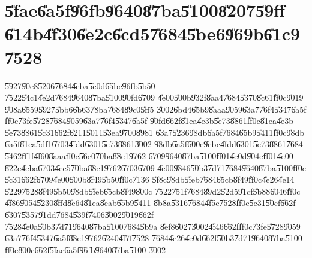                       

\part{\U{5fae}\U{6a5f}\U{96fb}\U{9640}\U{87ba}\U{5100}\U{8207}\U{59ff}%
\U{614b}\U{4f30}\U{6e2c}\U{6cd5}\U{7684}\U{5be6}\U{969b}\U{61c9}\U{7528}}

\setcounter{page}{1}

\U{5927}\U{90e8}\U{5206}\U{7684}\U{4eba}\U{5c0d}\U{65bc}\U{96fb}\U{5b50}%
\U{7522}\U{54c1}\U{4e2d}\U{7684}\U{9640}\U{87ba}\U{5100}\U{90fd}\U{6709}%
\U{4e00}\U{500b}\U{932f}\U{8aa4}\U{7684}\U{5370}\U{8c61}\U{ff0c}\U{9019}%
\U{908a}\U{6559}\U{5927}\U{5bb6}\U{6b63}\U{78ba}\U{7684}\U{89c0}\U{5ff5}%
\U{3002}\U{6bd4}\U{65b9}\U{8aaa}\U{9059}\U{63a7}\U{76f4}\U{5347}\U{6a5f}%
\U{ff0c}\U{73fe}\U{5728}\U{7684}\U{9059}\U{63a7}\U{76f4}\U{5347}\U{6a5f}%
\U{90fd}\U{662f}\U{81ea}\U{4e3b}\U{5e73}\U{8861}\U{ff0c}\U{81ea}\U{4e3b}%
\U{5e73}\U{8861}\U{5c31}\U{662f}\U{6211}\U{5011}\U{53ea}\U{9700}\U{8981}%
\U{63a7}\U{5236}\U{98db}\U{6a5f}\U{7684}\U{65b9}\U{5411}\U{ff0c}\U{98db}%
\U{6a5f}\U{81ea}\U{5df1}\U{6703}\U{4fdd}\U{6301}\U{5e73}\U{8861}\U{3002}%
\U{98db}\U{6a5f}\U{600e}\U{9ebc}\U{4fdd}\U{6301}\U{5e73}\U{8861}\U{7684}%
\U{5462}\U{ff1f}\U{4f60}\U{8aaa}\U{ff0c}\U{56e0}\U{70ba}\U{88e1}\U{9762}%
\U{6709}\U{9640}\U{87ba}\U{5100}\U{ff01}\U{4e0d}\U{904e}\U{ff01}\U{4e00}%
\U{822c}\U{4eba}\U{6703}\U{4ee5}\U{70ba}\U{88e1}\U{9762}\U{6703}\U{6709}%
\U{4e00}\U{9846}\U{50b3}\U{7d71}\U{7684}\U{9640}\U{87ba}\U{5100}\U{ff0c}%
\U{5c31}\U{662f}\U{6709}\U{4e00}\U{500b}\U{8f49}\U{5b50}\U{ff0c}\U{7136}%
\U{5f8c}\U{98db}\U{5feb}\U{7684}\U{65cb}\U{8f49}\U{ff0c}\U{4e26}\U{4e14}%
\U{5229}\U{7528}\U{8f49}\U{5b50}\U{98db}\U{5feb}\U{65cb}\U{8f49}\U{800c}%
\U{7522}\U{751f}\U{7684}\U{89d2}\U{52d5}\U{91cf}\U{5b88}\U{6046}\U{ff0c}%
\U{4f86}\U{9054}\U{5230}\U{8ffd}\U{8e64}\U{81ea}\U{8eab}\U{65b9}\U{5411}%
\U{8b8a}\U{5316}\U{7684}\U{4f5c}\U{7528}\U{ff0c}\U{5c31}\U{50cf}\U{662f}%
\U{6307}\U{5357}\U{91dd}\U{7684}\U{539f}\U{7406}\U{3002}\U{9019}\U{662f}%
\U{7528}\U{4e0a}\U{50b3}\U{7d71}\U{9640}\U{87ba}\U{5100}\U{7684}\U{5b9a}%
\U{8ef8}\U{6027}\U{3002}\U{4f46}\U{662f}\U{ff0c}\U{73fe}\U{5728}\U{9059}%
\U{63a7}\U{76f4}\U{5347}\U{6a5f}\U{88e1}\U{9762}\U{6240}\U{4f7f}\U{7528}%
\U{7684}\U{4e26}\U{4e0d}\U{662f}\U{50b3}\U{7d71}\U{9640}\U{87ba}\U{5100}%
\U{ff0c}\U{800c}\U{662f}\U{5fae}\U{6a5f}\U{96fb}\U{9640}\U{87ba}\U{5100}%
\U{3002}

\bigskip

